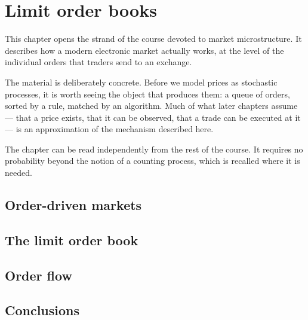 \chapter{Limit order books}
\label{chap.lob}

This chapter opens the strand of the course devoted to market microstructure.
It describes how a modern electronic market actually works,
at the level of the individual orders that traders send to an exchange.

The material is deliberately concrete.
Before we model prices as stochastic processes,
it is worth seeing the object that produces them:
a queue of orders,
sorted by a rule,
matched by an algorithm.
Much of what later chapters assume ---
that a price exists,
that it can be observed,
that a trade can be executed at it ---
is an approximation of the mechanism described here.

The chapter can be read independently from the rest of the course.
It requires no probability beyond the notion of a counting process,
which is recalled where it is needed.

\section{Order-driven markets}
\label{sec.orderDrivenMarkets}


\section{The limit order book}
\label{sec.theBook}


\section{Order flow}
\label{sec.orderFlow}


\section{Conclusions}
\label{sec.lobConclusions}

